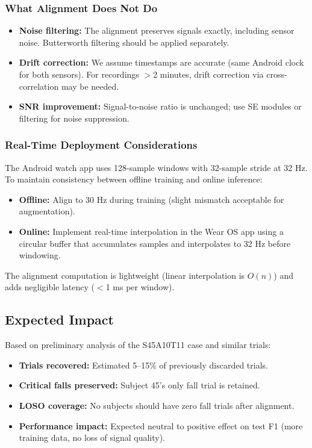 \subsubsection{What Alignment Does Not Do}

\begin{itemize}
    \item \textbf{Noise filtering:} The alignment preserves signals exactly, including sensor noise. Butterworth filtering should be applied separately.
    \item \textbf{Drift correction:} We assume timestamps are accurate (same Android clock for both sensors). For recordings $>$2 minutes, drift correction via cross-correlation may be needed.
    \item \textbf{SNR improvement:} Signal-to-noise ratio is unchanged; use SE modules or filtering for noise suppression.
\end{itemize}

\subsubsection{Real-Time Deployment Considerations}

The Android watch app uses 128-sample windows with 32-sample stride at 32 Hz. To maintain consistency between offline training and online inference:

\begin{itemize}
    \item \textbf{Offline:} Align to 30 Hz during training (slight mismatch acceptable for augmentation).
    \item \textbf{Online:} Implement real-time interpolation in the Wear OS app using a circular buffer that accumulates samples and interpolates to 32 Hz before windowing.
\end{itemize}

The alignment computation is lightweight (linear interpolation is $O(n)$) and adds negligible latency ($<$1 ms per window).

\subsection{Expected Impact}

Based on preliminary analysis of the S45A10T11 case and similar trials:

\begin{itemize}
    \item \textbf{Trials recovered:} Estimated 5--15\% of previously discarded trials.
    \item \textbf{Critical falls preserved:} Subject 45's only fall trial is retained.
    \item \textbf{LOSO coverage:} No subjects should have zero fall trials after alignment.
    \item \textbf{Performance impact:} Expected neutral to positive effect on test F1 (more training data, no loss of signal quality).
\end{itemize}

